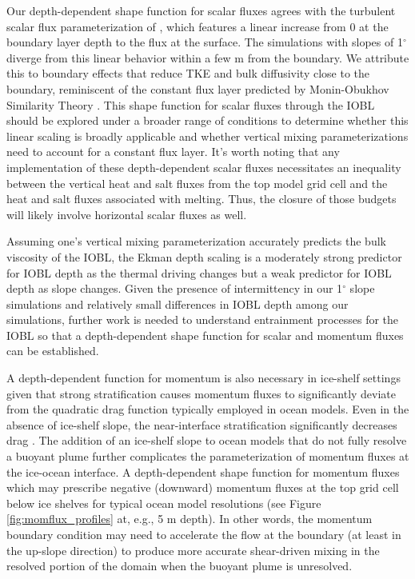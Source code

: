 \documentclass[draft]{agujournal2019}
\begin{document}
Our depth-dependent shape function for scalar fluxes agrees with the turbulent scalar flux parameterization of , which features a linear increase from 0 at the boundary layer depth to the flux at the surface. The simulations with slopes of 1$^{\circ}$ diverge from this linear behavior within a few m from the boundary. We attribute this to boundary effects that reduce TKE and bulk diffusivity close to the boundary, reminiscent of the constant flux layer predicted by Monin-Obukhov Similarity Theory \cite{monin_basic_1954}. This shape function for scalar fluxes through the IOBL should be explored under a broader range of conditions to determine whether this linear scaling is broadly applicable and whether vertical mixing parameterizations need to account for a constant flux layer. It's worth noting that any implementation of these depth-dependent scalar fluxes necessitates an inequality between the vertical heat and salt fluxes from the top model grid cell and the heat and salt fluxes associated with melting. Thus, the closure of those budgets will likely involve horizontal scalar fluxes as well.

Assuming one's vertical mixing parameterization accurately predicts the bulk viscosity of the IOBL, the Ekman depth scaling is a moderately strong predictor for IOBL depth as the thermal driving changes but a weak predictor for IOBL depth as slope changes. Given the presence of intermittency in our 1$^{\circ}$ slope simulations and relatively small differences in IOBL depth among our simulations, further work is needed to understand entrainment processes for the IOBL so that a depth-dependent shape function for scalar and momentum fluxes can be established. 

A depth-dependent function for momentum is also necessary in ice-shelf settings given that strong stratification causes momentum fluxes to significantly deviate from the quadratic drag function typically employed in ocean models. Even in the absence of ice-shelf slope, the near-interface stratification significantly decreases drag \cite{garcia-villalba_turbulence_2011, mcphee_revisiting_2008}. The addition of an ice-shelf slope to ocean models that do not fully resolve a buoyant plume further complicates the parameterization of momentum fluxes at the ice-ocean interface. A depth-dependent shape function for momentum fluxes which may prescribe negative (downward) momentum fluxes at the top grid cell below ice shelves for typical ocean model resolutions (see Figure \ref{fig:momflux_profiles} at, e.g., 5 m depth). In other words, the momentum boundary condition may need to accelerate the flow at the boundary (at least in the up-slope direction) to produce more accurate shear-driven mixing in the resolved portion of the domain when the buoyant plume is unresolved. 
\end{document}
